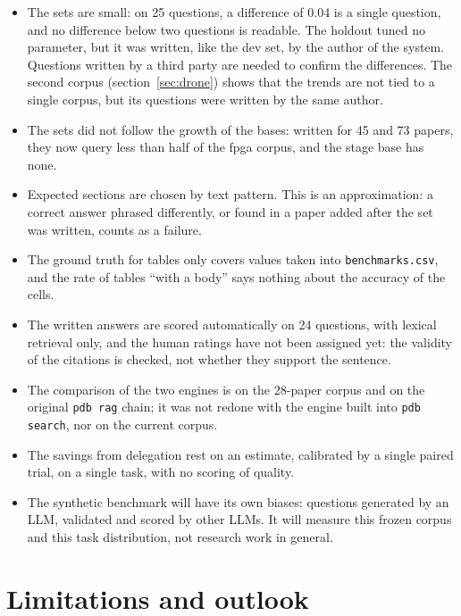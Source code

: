 \documentclass[11pt,a4paper]{article}
\newcommand{\cmd}[1]{\texttt{#1}}
\begin{document}
\begin{itemize}
  \item The sets are small: on 25 questions, a difference of 0.04 is a single question, and
    no difference below two questions is readable. The holdout tuned no parameter, but it was
    written, like the dev set, by the author of the system. Questions written by a third
    party are needed to confirm the differences. The second corpus
    (section~\ref{sec:drone}) shows that the trends are not tied to a single corpus, but its
    questions were written by the same author.
  \item The sets did not follow the growth of the bases: written for 45 and 73 papers, they
    now query less than half of the fpga corpus, and the stage base has none.
  \item Expected sections are chosen by text pattern. This is an approximation: a correct
    answer phrased differently, or found in a paper added after the set was written, counts
    as a failure.
  \item The ground truth for tables only covers values taken into \cmd{benchmarks.csv}, and the
    rate of tables ``with a body'' says nothing about the accuracy of the cells.
  \item The written answers are scored automatically on 24 questions, with lexical retrieval
    only, and the human ratings have not been assigned yet: the validity of the citations is
    checked, not whether they support the sentence.
  \item The comparison of the two engines is on the 28-paper corpus and on the original
    \cmd{pdb rag} chain; it was not redone with the engine built into \cmd{pdb search}, nor on
    the current corpus.
  \item The savings from delegation rest on an estimate, calibrated by a single paired trial,
    on a single task, with no scoring of quality.
  \item The synthetic benchmark will have its own biases: questions generated by an LLM,
    validated and scored by other LLMs. It will measure this frozen corpus and this task
    distribution, not research work in general.
\end{itemize}

\section{Limitations and outlook}
\end{document}
